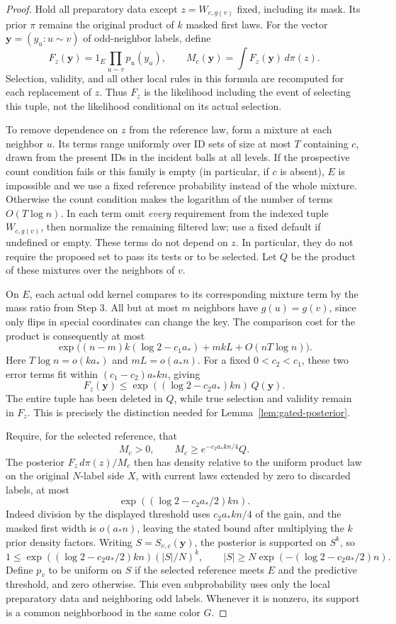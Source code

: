 \begin{proof}
Hold all preparatory data except \(z=W_{c,g(v)}\) fixed, including its
mask. Its prior \(\pi\) remains the original product of \(k\) masked
first laws. For the vector \(\mathbf y=(y_u:u\sim v)\) of odd-neighbor
labels, define
\[
 F_z(\mathbf y)=1_E\prod_{u\sim v}p_u(y_u),\qquad
 M_c(\mathbf y)=\int F_z(\mathbf y)\,d\pi(z).
\]
Selection, validity, and all other local rules in this formula are
recomputed for each replacement of \(z\). Thus \(F_z\) is the
likelihood including the event of selecting this tuple, not the
likelihood conditional on its actual selection.

To remove dependence on \(z\) from the reference law, form a mixture
at each neighbor \(u\). Its terms range uniformly over ID sets of size
at most \(T\) containing \(c\), drawn from the present IDs in the
incident balls at all levels. If the prospective count condition fails
or this family is empty (in particular, if \(c\) is absent), \(E\) is
impossible and we use a fixed reference probability instead of the
whole mixture. Otherwise the count condition makes the
logarithm of the number of terms \(O(T\log n)\). In each term omit
\emph{every} requirement from the indexed tuple \(W_{c,g(v)}\), then
normalize the remaining filtered law; use a fixed default if undefined
or empty. These terms do not depend on \(z\). In particular, they do
not require the proposed set to pass its tests or to be selected.
Let \(Q\) be the product of these mixtures over the neighbors of \(v\).

On \(E\), each actual odd kernel compares to its corresponding mixture
term by the mass ratio from Step 3. All but at most \(m\) neighbors have
\(g(u)=g(v)\), since only flips in special coordinates can change the
key. The comparison cost for the product is consequently at most
\[
 \exp\bigl((n-m)k(\log2-c_1a_*)+mkL+O(nT\log n)\bigr).
\]
Here \(T\log n=o(ka_*)\) and \(mL=o(a_*n)\). For a fixed
\(0<c_2<c_1\), these two error terms fit within
\((c_1-c_2)a_*kn\), giving
\[
 F_z(\mathbf y)\le\exp((\log2-c_2a_*)kn)\,Q(\mathbf y).
\]
The entire tuple has been deleted in \(Q\), while true selection and
validity remain in \(F_z\). This is precisely the distinction needed
for Lemma~\ref{lem:gated-posterior}.

Require, for the selected reference, that
\[
 M_c>0,\qquad M_c\ge e^{-c_2a_*kn/4}Q.
\]
The posterior \(F_z\,d\pi(z)/M_c\) then has density relative to the
uniform product law on the original \(N\)-label side \(X\), with current
laws extended by zero to discarded labels, at most
\[
 \exp((\log2-c_2a_*/2)kn).
\]
Indeed division by the displayed threshold uses \(c_2a_*kn/4\) of the
gain, and the masked first width is \(o(a_*n)\), leaving the stated
bound after multiplying the \(k\) prior density factors.
Writing \(S=S_{v,c}(\mathbf y)\), the posterior is supported on
\(S^k\), so
\[
 1\le\exp((\log2-c_2a_*/2)kn)(|S|/N)^k,
 \qquad |S|\ge N\exp(-(\log2-c_2a_*/2)n).
\]
Define \(p_v\) to be uniform on \(S\) if the selected reference meets
\(E\) and the predictive threshold, and zero otherwise. This even
subprobability uses only the local preparatory data and neighboring odd
labels. Whenever it is nonzero, its support is a common neighborhood in
the same color \(G\).


\end{proof}
